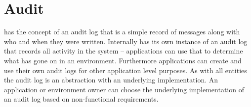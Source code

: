 \section{Audit}

\Rapture has the concept of an audit log that is a simple record of messages along with who and when they were written. Internally \Rapture has its own instance of
an audit log that records all activity in the system -- applications can use that to determine what has gone on in an environment. Furthermore applications can create
and use their own audit logs for other application level purposes. As with all \Rapture entities the audit log is an abstraction with an underlying implementation. An application
or environment owner can choose the underlying implementation of an audit log based on non-functional requirements.

